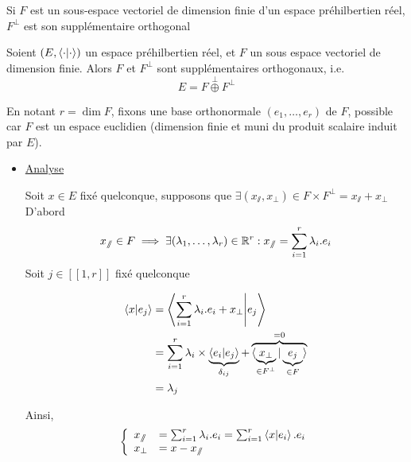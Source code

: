 \documentclass{article}
\renewenvironment{question_kholle}[2][ ]
{
	\subsection{\texorpdfstring{#2}{}}
	\notblank{#1}
	{
		\noindent #1
		\bigbreak
	}
	{}
	\begin{proof}
}
{
	\end{proof}
}
\begin{document}
\begin{question_kholle}{Si $F$ est un sous-espace vectoriel de dimension finie d'un espace préhilbertien réel, $F^{\perp}$ est son supplémentaire orthogonal}


  Soient $(E, \braket{ \cdot | \cdot })$ un espace préhilbertien réel, et $F$ un sous espace vectoriel de dimension finie.
  Alors $F$ et $F^{\perp}$ sont supplémentaires orthogonaux, i.e.
  \begin{equation}
    E = F  \overset{\perp}{\oplus} F^{\perp}
  \end{equation}



  En notant $r = \dim F$, fixons une base orthonormale $(e_{1}, \dots, e_{r})$ de $F$, possible car $F$ est un espace euclidien (dimension finie et muni du produit scalaire induit par $E$).
  \begin{itemize}[label=$\lozenge$]
    \item \underline{Analyse}

          Soit $x \in E$ fixé quelconque, supposons que $\exists (x_{\sslash}, x_{\perp}) \in F \times F^{\perp} = x_{\sslash}+x_{\perp}$
          D'abord $$x_{\sslash} \in F \implies \exists (\lambda_{1}, \dots, \lambda_{r}) \in \mathbb R^{r}: x_{\sslash}= \sum_{i=1}^{r}\lambda_{i}.e_{i}$$
          Soit $j \in [ \! [ 1, r ] \!]$ fixé quelconque

          \begin{align*}
            \braket{ x | e_{j} } & =   \left\langle \sum_{i=1}^{r}\lambda_{i}.e_{i} + x_{\perp} \Bigg| e_{j}  \right\rangle                                                                                                                 \\
                                 & = \sum_{i=1}^{r}\lambda_{i}\times \underbrace{ \braket{ e_{i} | e_{j} } }_{ \delta_{ij} }  + \overbrace{ \braket{ \underbrace{ x_{\perp} }_{ \in F^{\perp} } | \underbrace{ e_{j} }_{ \in F } } }^{ =0 } \\
                                 & = \lambda_{j}
          \end{align*}

          Ainsi, $$\left\{ \begin{array}{ll}
              x_{\sslash} & = \sum_{i=1}^{r}\lambda_{i}.e_{i}= \sum_{i=1}^{r}\braket{ x | e_{i} } . e_{i} \\
              x_{\perp}   & = x - x_{\sslash}
            \end{array}\right.$$


\end{itemize}
\end{question_kholle}
\end{document}

